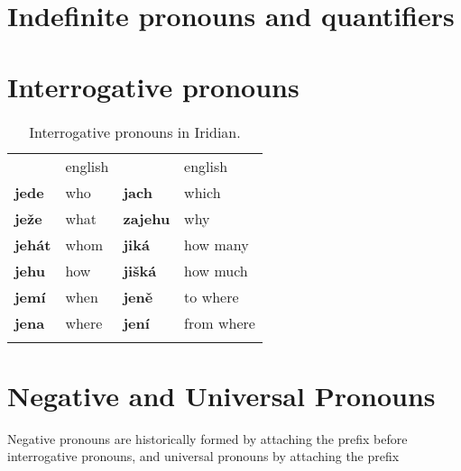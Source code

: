 \section{Indefinite pronouns and quantifiers}


\section{Interrogative pronouns}\label{sec:int-pron}

\begin{table}[h!]
	\small\centering
	\caption{Interrogative pronouns in Iridian.}
	\begin{tabu} to 0.8
		\toprule\addlinespace
		&{\sc english}&&{\sc english}\\ \addlinespace
		\midrule\addlinespace
		jede 		& who &jach &which\\ \addlinespace
		ježe 	& what 		& zajehu 	&why\\ \addlinespace
		jehát 	& whom		& jiká 	&how many\\ \addlinespace
		jehu 		& how		&jišká&how much\\ \addlinespace
		jemí 		& when 		& jen\v{e} 	&to where\\ \addlinespace
		jena 		& where 	& jení 	&from where\\ \addlinespace
		\bottomrule
	\end{tabu}
\end{table}

\section{Negative and Universal Pronouns}

Negative pronouns are historically formed by attaching the prefix  before interrogative pronouns, and universal pronouns by attaching the prefix 

